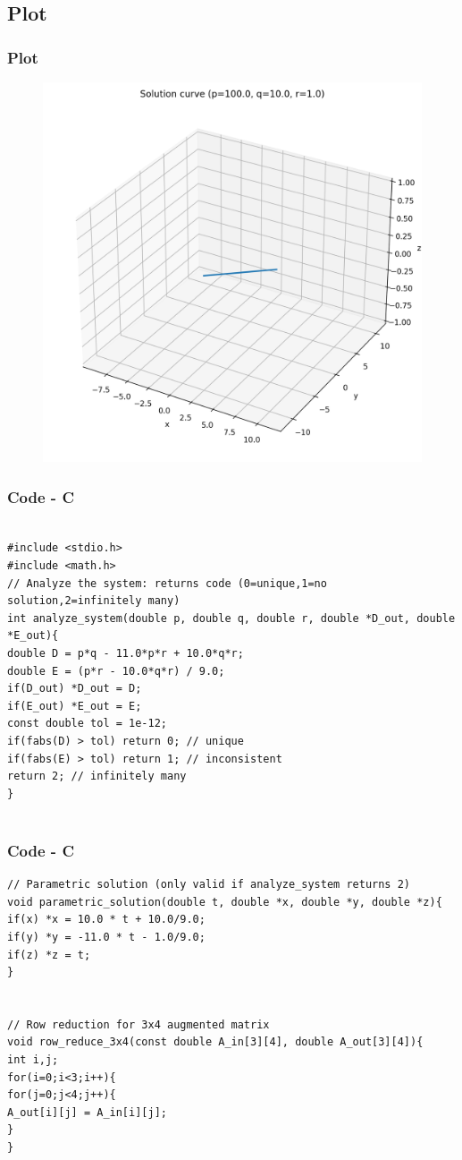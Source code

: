 \documentclass{beamer}
\theoremstyle{remark}
\numberwithin{equation}{section}
\begin{document}
\subsection{Plot}
\begin{frame}
    \frametitle{Plot}
\begin{figure}[H]
   \centering
   \includegraphics[width=0.7\columnwidth]{figs/hp_3d_only.png}
   \caption{}
   \label{}
   \end{figure}
\end{frame}

\begin{frame}[fragile]
    \frametitle{Code - C}
    \begin{lstlisting}

#include <stdio.h>
#include <math.h>
// Analyze the system: returns code (0=unique,1=no solution,2=infinitely many)
int analyze_system(double p, double q, double r, double *D_out, double *E_out){
double D = p*q - 11.0*p*r + 10.0*q*r;
double E = (p*r - 10.0*q*r) / 9.0;
if(D_out) *D_out = D;
if(E_out) *E_out = E;
const double tol = 1e-12;
if(fabs(D) > tol) return 0; // unique
if(fabs(E) > tol) return 1; // inconsistent
return 2; // infinitely many
}


    \end{lstlisting}
    \end{frame}

    \begin{frame}[fragile]
    \frametitle{Code - C}
    \begin{lstlisting}
// Parametric solution (only valid if analyze_system returns 2)
void parametric_solution(double t, double *x, double *y, double *z){
if(x) *x = 10.0 * t + 10.0/9.0;
if(y) *y = -11.0 * t - 1.0/9.0;
if(z) *z = t;
}


// Row reduction for 3x4 augmented matrix
void row_reduce_3x4(const double A_in[3][4], double A_out[3][4]){
int i,j;
for(i=0;i<3;i++){
for(j=0;j<4;j++){
A_out[i][j] = A_in[i][j];
}
}

\end{lstlisting}
\end{frame}
\end{document}
